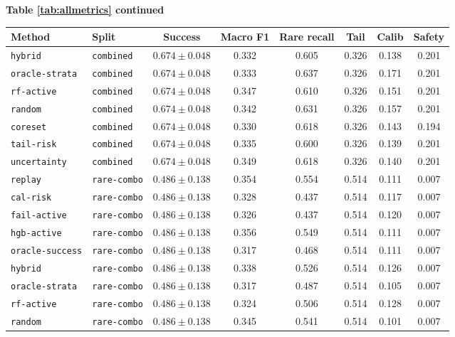 \documentclass{article}
\begin{document}
\begin{center}
\textbf{Table \ref{tab:allmetrics} continued}\\[0.4ex]
\begin{tabular}{llcccccc}
\toprule
Method & Split & Success & Macro F1 & Rare recall & Tail & Calib & Safety \\
\midrule
\texttt{hybrid} & \texttt{combined} & $0.674 \pm 0.048$ & 0.332 & 0.605 & 0.326 & 0.138 & 0.201 \\
\texttt{oracle-strata} & \texttt{combined} & $0.674 \pm 0.048$ & 0.333 & 0.637 & 0.326 & 0.171 & 0.201 \\
\texttt{rf-active} & \texttt{combined} & $0.674 \pm 0.048$ & 0.347 & 0.610 & 0.326 & 0.151 & 0.201 \\
\texttt{random} & \texttt{combined} & $0.674 \pm 0.048$ & 0.342 & 0.631 & 0.326 & 0.157 & 0.201 \\
\texttt{coreset} & \texttt{combined} & $0.674 \pm 0.048$ & 0.330 & 0.618 & 0.326 & 0.143 & 0.194 \\
\texttt{tail-risk} & \texttt{combined} & $0.674 \pm 0.048$ & 0.335 & 0.600 & 0.326 & 0.139 & 0.201 \\
\texttt{uncertainty} & \texttt{combined} & $0.674 \pm 0.048$ & 0.349 & 0.618 & 0.326 & 0.140 & 0.201 \\
\texttt{replay} & \texttt{rare-combo} & $0.486 \pm 0.138$ & 0.354 & 0.554 & 0.514 & 0.111 & 0.007 \\
\texttt{cal-risk} & \texttt{rare-combo} & $0.486 \pm 0.138$ & 0.328 & 0.437 & 0.514 & 0.117 & 0.007 \\
\texttt{fail-active} & \texttt{rare-combo} & $0.486 \pm 0.138$ & 0.326 & 0.437 & 0.514 & 0.120 & 0.007 \\
\texttt{hgb-active} & \texttt{rare-combo} & $0.486 \pm 0.138$ & 0.356 & 0.549 & 0.514 & 0.111 & 0.007 \\
\texttt{oracle-success} & \texttt{rare-combo} & $0.486 \pm 0.138$ & 0.317 & 0.468 & 0.514 & 0.111 & 0.007 \\
\texttt{hybrid} & \texttt{rare-combo} & $0.486 \pm 0.138$ & 0.338 & 0.526 & 0.514 & 0.126 & 0.007 \\
\texttt{oracle-strata} & \texttt{rare-combo} & $0.486 \pm 0.138$ & 0.317 & 0.487 & 0.514 & 0.105 & 0.007 \\
\texttt{rf-active} & \texttt{rare-combo} & $0.486 \pm 0.138$ & 0.324 & 0.506 & 0.514 & 0.128 & 0.007 \\
\texttt{random} & \texttt{rare-combo} & $0.486 \pm 0.138$ & 0.345 & 0.541 & 0.514 & 0.101 & 0.007 \\

\end{tabular}
\end{center}
\end{document}
